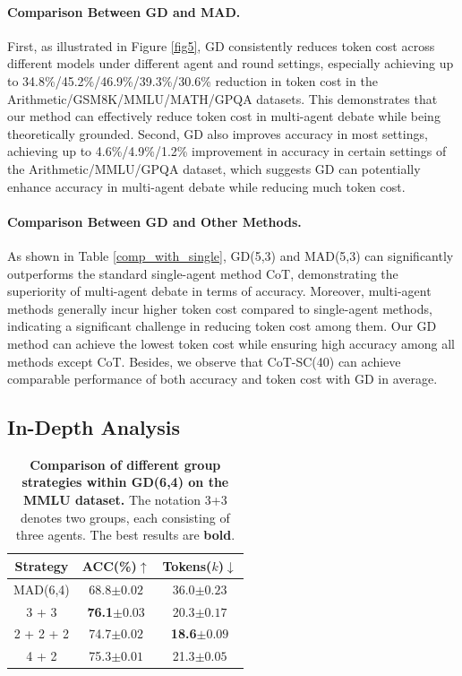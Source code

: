 \paragraph{Comparison Between GD and MAD.} First, as illustrated in Figure \ref{fig5}, GD consistently reduces token cost across different models under different agent and round settings, especially achieving up to 34.8\%/45.2\%/46.9\%/39.3\%/30.6\% reduction in token cost in the Arithmetic/GSM8K/MMLU/MATH/GPQA datasets. This demonstrates that our method can effectively reduce token cost in multi-agent debate while being theoretically grounded. Second, GD also improves accuracy in most settings, achieving up to 4.6\%/4.9\%/1.2\% improvement in accuracy in certain settings of the Arithmetic/MMLU/GPQA dataset, which suggests GD can potentially enhance accuracy in multi-agent debate while reducing much token cost.

\paragraph{Comparison Between GD and Other Methods.} As shown in Table \ref{comp_with_single}, GD(5,3) and MAD(5,3) can significantly outperforms the standard single-agent method CoT, demonstrating the superiority of multi-agent debate in terms of accuracy. Moreover, multi-agent methods generally incur higher token cost compared to single-agent methods, indicating a significant challenge in reducing token cost among them. Our GD method can achieve the lowest token cost while ensuring high accuracy among all methods except CoT. Besides, we observe that CoT-SC(40) can achieve comparable performance of both accuracy and token cost with GD in average.

\subsection{In-Depth Analysis} \label{hyperparameter-study}

\begin{table}
\centering
\begin{tabular}{ccc} 
\toprule
 Strategy    & ACC(\%)$\uparrow$    & Tokens($k$)$\downarrow$  \\ 
\midrule
MAD(6,4)   & 68.8\scriptsize{$\pm 0.02$} & 36.0\scriptsize{$\pm 0.23$}  \\
\midrule
3 + 3   & \textbf{76.1}\scriptsize{$\pm 0.03$} & 20.3\scriptsize{$\pm 0.17$}  \\
2 + 2 + 2 & 74.7\scriptsize{$\pm 0.02$} & \textbf{18.6}\scriptsize{$\pm 0.09$}  \\
4 + 2   & 75.3\scriptsize{$\pm 0.01$}  & 21.3\scriptsize{$\pm 0.05$}  \\
\bottomrule
\end{tabular}
\caption{\textbf{Comparison of different group strategies within GD(6,4) on the MMLU dataset.} The notation 3+3 denotes two groups, each consisting of three agents. The best results are \textbf{bold}.}
\label{group}
\end{table}

